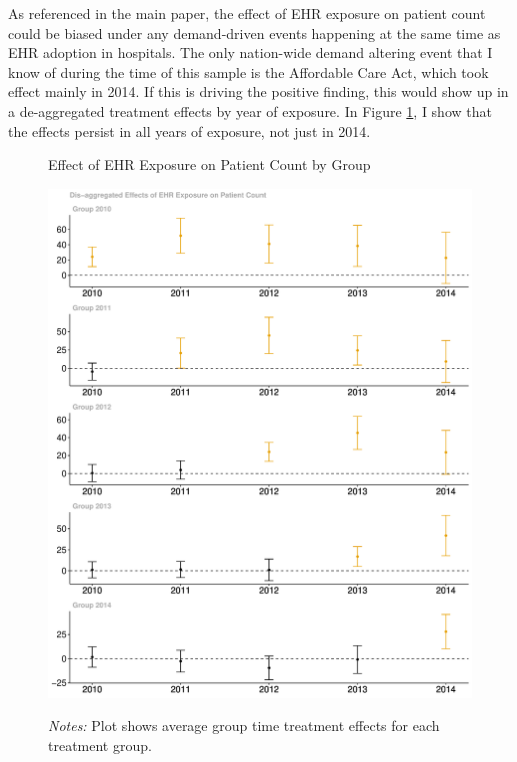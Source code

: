 \documentclass[12pt]{article}
\begin{document}
As referenced in the main paper, the effect of EHR exposure on patient count could be biased under any demand-driven events happening at the same time as EHR adoption in hospitals. The only nation-wide demand altering event that I know of during the time of this sample is the Affordable Care Act, which took effect mainly in 2014. If this is driving the positive finding, this would show up in a de-aggregated treatment effects by year of exposure. In Figure \ref{fig:patientgroup}, I show that the effects persist in all years of exposure, not just in 2014. 

\begin{figure}[ht!]
    \centering
    \captionsetup{width=.6\linewidth}
    \caption{Effect of EHR Exposure on Patient Count by Group}
    \includegraphics[scale=.4]{Objects/patient_group.pdf}
    \label{fig:patientgroup}
    \vspace{2mm}
    \caption*{\footnotesize{\textit{Notes:} Plot shows average group time treatment effects for each treatment group.}}
\end{figure}
\end{document}
